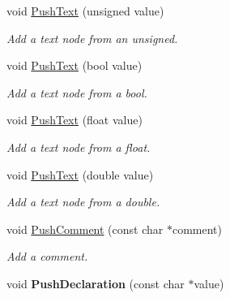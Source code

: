 \begin{DoxyCompactItemize}
void \hyperlink{classtinyxml2_1_1XMLPrinter_a661fb50e7e0a4918d2d259cb0fae647e}{Push\+Text} (unsigned value)
\begin{DoxyCompactList}\small\item\em Add a text node from an unsigned. \end{DoxyCompactList}\item 
\mbox{\label{classtinyxml2_1_1XMLPrinter_a4390e5fa1ed05189a8686647345ab29f}} 
void \hyperlink{classtinyxml2_1_1XMLPrinter_a4390e5fa1ed05189a8686647345ab29f}{Push\+Text} (bool value)
\begin{DoxyCompactList}\small\item\em Add a text node from a bool. \end{DoxyCompactList}\item 
\mbox{\label{classtinyxml2_1_1XMLPrinter_a1dbb1390e829d0673af66b9cd1928bd7}} 
void \hyperlink{classtinyxml2_1_1XMLPrinter_a1dbb1390e829d0673af66b9cd1928bd7}{Push\+Text} (float value)
\begin{DoxyCompactList}\small\item\em Add a text node from a float. \end{DoxyCompactList}\item 
\mbox{\label{classtinyxml2_1_1XMLPrinter_aa715302dfc09473c77c853cbd5431965}} 
void \hyperlink{classtinyxml2_1_1XMLPrinter_aa715302dfc09473c77c853cbd5431965}{Push\+Text} (double value)
\begin{DoxyCompactList}\small\item\em Add a text node from a double. \end{DoxyCompactList}\item 
\mbox{\label{classtinyxml2_1_1XMLPrinter_afc8416814219591c2fd5656e0c233140}} 
void \hyperlink{classtinyxml2_1_1XMLPrinter_afc8416814219591c2fd5656e0c233140}{Push\+Comment} (const char $\ast$comment)
\begin{DoxyCompactList}\small\item\em Add a comment. \end{DoxyCompactList}\item 
\mbox{\label{classtinyxml2_1_1XMLPrinter_a2fe3565e262594efc6c0276723c83fe7}} 
void {\bfseries Push\+Declaration} (const char $\ast$value)

\end{DoxyCompactItemize}
